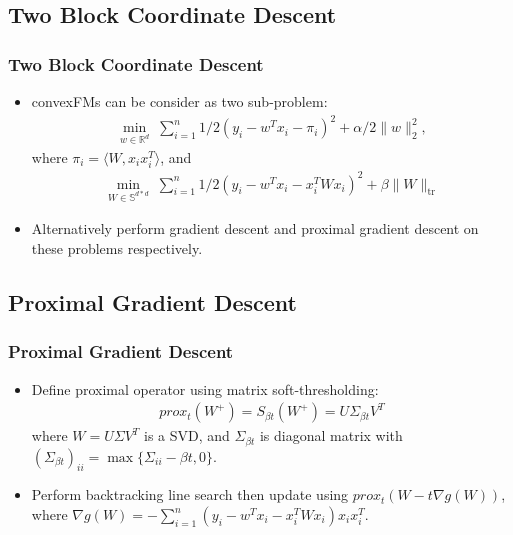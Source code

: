 \documentclass{beamer}
\begin{document}
\subsection{Two Block Coordinate Descent}
\begin{frame}
\frametitle{Two Block Coordinate Descent}
\begin{itemize}
  \item convexFMs can be consider as two sub-problem:
  \begin{align*}
 \min_{w \in \mathbb{R}^{d}} \;
\sum_{i = 1}^n 1/2(y_i-w^T x_i-\pi_i)^2 + \alpha /2 \|w\|_2^2,
\end{align*}
where $\pi_i=\langle W,x_i x_i^T\rangle$, and
\begin{align*}
 \min_{W \in \mathbb{S}^{d*d}} \;
\sum_{i = 1}^n 1/2(y_i-w^T x_i-x_i^T W x_i)^2 + \beta\|W\|_{\text{tr}}
\end{align*}
  \item Alternatively perform gradient descent and proximal gradient descent on these problems respectively.
\end{itemize}
\end{frame}

\subsection{Proximal Gradient Descent}
\begin{frame}
\frametitle{Proximal Gradient Descent}
\begin{itemize}
  \item Define proximal operator using matrix soft-thresholding: \begin{align*}
prox_t(W^{+})=S_{\beta t}(W^{+})=U\Sigma_{\beta t} V^T
\end{align*}
where $W=U\Sigma V^T$ is a SVD, and $\Sigma_{\beta t}$ is diagonal matrix with $(\Sigma_{\beta t})_{ii}=\max\{\Sigma_{ii}-\beta t,0\}$.
  \item Perform backtracking line search then update using $prox_t(W-t\nabla g(W))$, where $\nabla g(W)=-\sum_{i = 1}^n(y_i-w^T x_i-x_i^T W x_i)x_i x_i^T$.
\end{itemize}
\end{frame}
\end{document}

